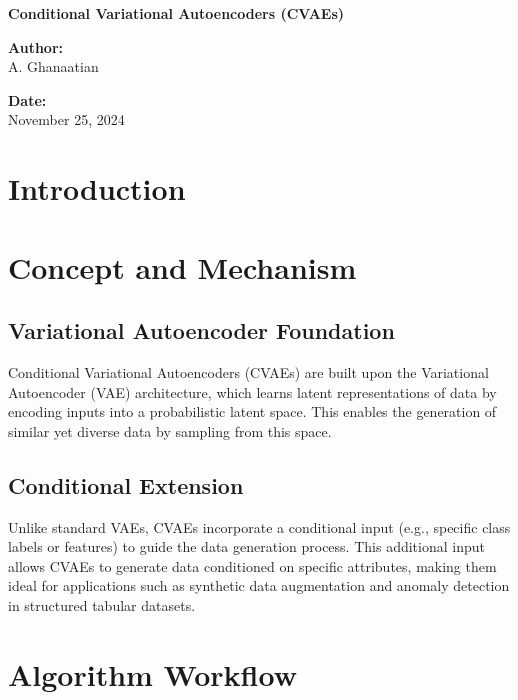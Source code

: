 \documentclass[a4paper,10pt]{article}
\begin{document}
\begin{titlepage}
    \centering
    \vspace*{2cm}
    
    {\LARGE \textbf{Conditional Variational Autoencoders (CVAEs)}}
    
    \vspace{1.5cm}
    
    {\large \textbf{Author:} \\
    A. Ghanaatian}
    
    \vfill
    
    {\large \textbf{Date:} \\
    November 25, 2024}
    
\end{titlepage}


\section{Introduction}

\section{Concept and Mechanism}

\subsection{Variational Autoencoder Foundation}
Conditional Variational Autoencoders (CVAEs) are built upon the Variational Autoencoder (VAE) architecture, which learns latent representations of data by encoding inputs into a probabilistic latent space. This enables the generation of similar yet diverse data by sampling from this space.

\subsection{Conditional Extension}
Unlike standard VAEs, CVAEs incorporate a conditional input (e.g., specific class labels or features) to guide the data generation process. This additional input allows CVAEs to generate data conditioned on specific attributes, making them ideal for applications such as synthetic data augmentation and anomaly detection in structured tabular datasets.

\section{Algorithm Workflow}
\end{document}
